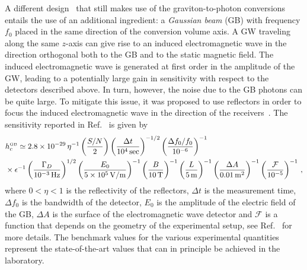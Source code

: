 \documentclass[11pt,a4paper]{article}
\begin{document}
A different design~\cite{Li:2000du, Li:2003tv, Li:2004df, Li:2006sx, Li:2008qr, Tong:2008rz, Stephenson:2009zz, Li:2009zzy, Li:2011zzl, Li:2013fna, Li:2014bma, Li:2015nti} that still makes use of the graviton-to-photon conversions entails the use of an additional ingredient: a \textit{Gaussian beam} (GB) with frequency $f_0$ placed in the same direction of the conversion volume axis. A GW traveling along the same $z$-axis can give rise to an induced electromagnetic wave in the direction orthogonal both to the GB and to the static magnetic field. The induced electromagnetic wave is generated at first order in the amplitude of the GW, leading to a potentially large gain in sensitivity with respect to the detectors described above. 
In turn, however, the noise due to the GB photons can be quite large. 
To mitigate this issue, it was proposed to use reflectors in order to focus the induced electromagnetic wave in the direction of the receivers~\cite{Li:2008qr, PhysRevLett.89.223901, doi:10.1063/1.1553993, Hou:05, Woods:2012upj, Ringwald:2020ist}. 
The sensitivity reported in Ref.~\cite{Ringwald:2020ist} is given by
\begin{align}
\label{eq:GBsensitivity}
&
h_c^{\text{\tiny  GB} }
\simeq 
2.8
\times 10^{-29} \, \eta^{-1} \left(\frac{S/N}{2}\right) \left(\frac{\Delta t}{10^4 \, {\rm sec}}\right)^{-1/2} \left(\frac{\Delta f_0/f_0}{10^{-6}}\right)^{-1} \nonumber \\
&\times \epsilon^{-1} \left(\frac{\Gamma_D}{10^{-3} \, {}\rm Hz}\right)^{1/2} \left(\frac{E_0}{5 \times 10^5 \, {\rm V}/{\rm m}}\right)^{-1} \left(\frac{B}{10 \, {\rm T}}\right)^{-1} \left(\frac{L}{5 \, {\rm m}}\right)^{-1} \left(\frac{\Delta A}{0.01 \, {\rm m}^2}\right)^{-1} \left(\frac{\mathcal{F}}{10^{-5}}\right)^{-1} \,,
\end{align}
where $0 < \eta < 1$ is the reflectivity of the reflectors, $\Delta t$ is the measurement time, $\Delta f_0$ is the bandwidth of the detector, $E_0$ is the amplitude of the electric field of the GB, $\Delta A$ is the surface of the electromagnetic wave detector and $\mathcal{F}$ is a function that depends on the geometry of the experimental setup, see Ref.~\cite{Ringwald:2020ist} for more details.
The benchmark values for the various experimental quantities represent the state-of-the-art values that can in principle be achieved in the laboratory.
\end{document}
